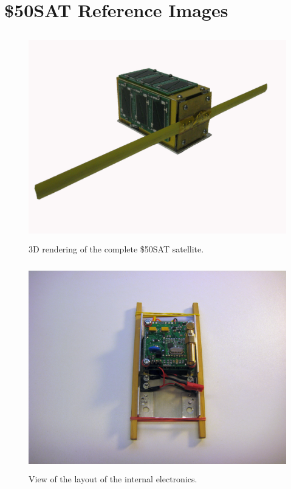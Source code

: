 \documentclass[conference]{IEEEtran} %
\begin{document}

\onecolumn
\appendices{}
\section{\$50SAT Reference Images}
\begin{figure}[h]
 \centering
 \includegraphics[width=12cm, height=9cm]{50sat_model.jpg}
 \caption{3D rendering of the complete \$50SAT satellite.}
\end{figure}

\begin{figure}[h]
 \centering
 \includegraphics[width=12cm, height=9cm]{internal_pcbs.jpg}
 \caption{View of the layout of the internal electronics.}
\end{figure}
\end{document}
